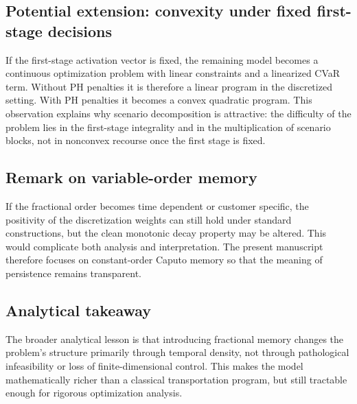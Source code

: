\subsection{Potential extension: convexity under fixed first-stage decisions}
If the first-stage activation vector is fixed, the remaining model becomes a continuous optimization problem with linear constraints and a linearized CVaR term. Without PH penalties it is therefore a linear program in the discretized setting. With PH penalties it becomes a convex quadratic program. This observation explains why scenario decomposition is attractive: the difficulty of the problem lies in the first-stage integrality and in the multiplication of scenario blocks, not in nonconvex recourse once the first stage is fixed.

\subsection{Remark on variable-order memory}
If the fractional order becomes time dependent or customer specific, the positivity of the discretization weights can still hold under standard constructions, but the clean monotonic decay property may be altered. This would complicate both analysis and interpretation. The present manuscript therefore focuses on constant-order Caputo memory so that the meaning of persistence remains transparent.

\subsection{Analytical takeaway}
The broader analytical lesson is that introducing fractional memory changes the problem's structure primarily through temporal density, not through pathological infeasibility or loss of finite-dimensional control. This makes the model mathematically richer than a classical transportation program, but still tractable enough for rigorous optimization analysis.